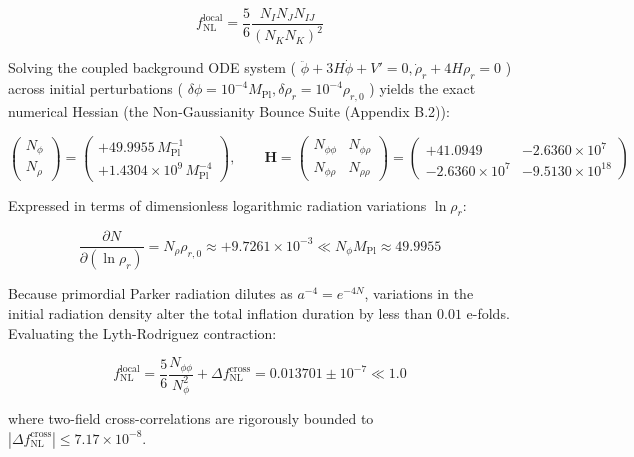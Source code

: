 \documentclass[11pt,a4paper]{article}
\theoremstyle{definition}\newtheorem{definition}{Definition}
\theoremstyle{remark}\newtheorem{remark}{Remark}
\begin{document}
\begin{equation}
f_{\text{NL}}^{\text{local}} = \frac{5}{6} \frac{N_I N_J N_{IJ}}{(N_K N_K)^2}
\end{equation}


Solving the coupled background ODE system ( $\ddot{\phi} + 3H\dot{\phi} + V' = 0, \dot{\rho}_r + 4H\rho_r = 0$ ) across initial perturbations ( $\delta\phi = 10^{-4} M_{\text{Pl}}, \delta\rho_r = 10^{-4} \rho_{r,0}$ ) yields the exact numerical Hessian (the Non-Gaussianity Bounce Suite (Appendix B.2)):


\begin{equation}
\begin{pmatrix} N_\phi \\ N_\rho \end{pmatrix} = \begin{pmatrix} +49.9955 \, M_{\text{Pl}}^{-1} \\ +1.4304 \times 10^9 \, M_{\text{Pl}}^{-4} \end{pmatrix}, \qquad \mathbf{H} = \begin{pmatrix} N_{\phi\phi} & N_{\phi\rho} \\ N_{\phi\rho} & N_{\rho\rho} \end{pmatrix} = \begin{pmatrix} +41.0949 & -2.6360 \times 10^7 \\ -2.6360 \times 10^7 & -9.5130 \times 10^{18} \end{pmatrix}
\end{equation}


Expressed in terms of dimensionless logarithmic radiation variations $\ln\rho_r$:


\begin{equation}
\frac{\partial N}{\partial(\ln\rho_r)} = N_\rho \rho_{r,0} \approx +9.7261 \times 10^{-3} \ll N_\phi M_{\text{Pl}} \approx 49.9955
\end{equation}


Because primordial Parker radiation dilutes as $a^{-4} = e^{-4N}$, variations in the initial radiation density alter the total inflation duration by less than $0.01$ e-folds. Evaluating the Lyth-Rodriguez contraction:


\begin{equation}
\boxed{f_{\text{NL}}^{\text{local}} = \frac{5}{6} \frac{N_{\phi\phi}}{N_\phi^2} + \Delta f_{\text{NL}}^{\text{cross}} = 0.013701 \pm 10^{-7} \ll 1.0}
\end{equation}


where two-field cross-correlations are rigorously bounded to $|\Delta f_{\text{NL}}^{\text{cross}}| \le 7.17 \times 10^{-8}$.
\end{document}
